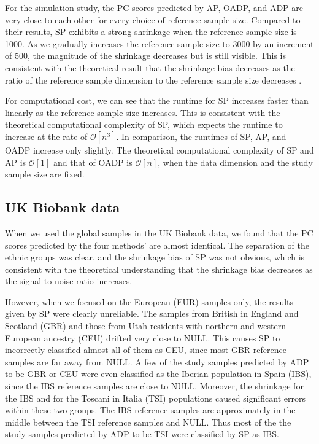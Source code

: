 \documentclass{article}
\newcommand{\bO}{\mathcal{O}}
\begin{document}
For the simulation study,
the PC scores predicted by AP, OADP, and ADP
are very close to each other
for every choice of reference sample size.
Compared to their results,
SP exhibits a strong shrinkage
when the reference sample size is 1000.
As we gradually increases the reference sample size to 3000
by an increment of 500,
the magnitude of the shrinkage decreases
but is still visible.
This is consistent with the theoretical result
that the shrinkage bias decreases
as the ratio of
the reference sample dimension to the reference sample size
decreases \citep{dey2016asymptotic}.

For computational cost,
we can see that the runtime for SP increases faster than linearly
as the reference sample size increases.
This is consistent
with the theoretical computational complexity of SP,
which expects the runtime to increase at the rate of $\bO[n^3]$.
In comparison, the runtimes of SP, AP, and OADP
increase only slightly.
The theoretical computational complexity of SP and AP is $\bO[1]$
and that of OADP is $\bO[n]$,
when the data dimension and the study sample size are fixed.

\subsection{UK Biobank data}

When we used the global samples in the UK Biobank data,
we found that the PC scores predicted by the four methods' are almost identical.
The separation of the ethnic groups was clear,
and the shrinkage bias of SP was not obvious,
which is consistent with the theoretical understanding
that the shrinkage bias decreases
as the signal-to-noise ratio increases.

However, when we focused on the European (EUR) samples only,
the results given by SP were clearly unreliable.
The samples from British in England and Scotland (GBR)
and those from Utah residents with northern and western European ancestry	(CEU)
drifted very close to NULL.
This causes SP to incorrectly classified almost all of them as CEU,
since most GBR reference samples are far away from NULL.
A few of the study samples predicted by ADP to be GBR or CEU
were even classified as the Iberian population in Spain (IBS),
since the IBS reference samples are close to NULL.
Moreover, the shrinkage for the IBS
and for the Toscani in Italia (TSI) populations
caused significant errors within these two groups.
The IBS reference samples
are approximately in the middle
between the TSI reference samples and NULL.
Thus most of the the study samples predicted by ADP to be TSI
were classified by SP as IBS.
\end{document}
